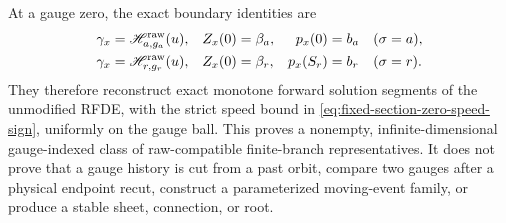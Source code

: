 \begin{theorem}
At a gauge zero, the exact boundary identities are
\begin{align}
 \gamma_x&=\mathscr H_{a,g_a}^{\rm raw}(u),&
 Z_x(0)&=\beta_a,&p_x(0)&=b_a &&(\sigma=a),\notag\\
 \gamma_x&=\mathscr H_{r,g_r}^{\rm raw}(u),&
 Z_x(0)&=\beta_r,&p_x(S_r)&=b_r &&(\sigma=r).     \label{eq:raw-gauge-exact-boundary-identities}
\end{align}
They therefore reconstruct exact monotone forward solution segments of the
unmodified RFDE, with the strict speed bound in
\cref{eq:fixed-section-zero-speed-sign}, uniformly on the gauge ball.
This proves a nonempty, infinite-dimensional gauge-indexed class of
raw-compatible finite-branch representatives.  It does not prove that a gauge history is
cut from a past orbit, compare two gauges after a physical endpoint recut,
construct a parameterized moving-event family, or produce a stable sheet,
connection, or root.
\end{theorem}

